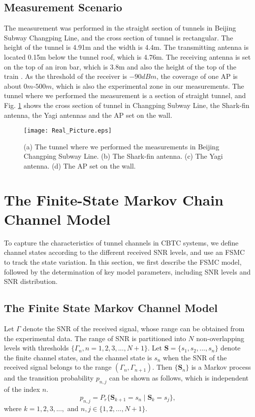 \documentclass[conference]{IEEEtran}
\begin{document}
\subsection{Measurement Scenario}
The measurement was performed in the straight section of tunnels in Beijing Subway Changping Line, and the cross section of tunnel is rectangular. The height of the tunnel is 4.91m and the width is 4.4m. The transmitting antenna is located 0.15m below the tunnel roof, which is 4.76m. The receiving antenna is set on the top of an iron bar, which is 3.8m and also the height of the top of the train . As the threshold of the receiver is $-90dBm$, the coverage of one AP is about $0m$-$500m$, which is also the experimental zone in our measurements. The tunnel where we performed the measurement is a section of straight tunnel, and Fig. \ref{RT} shows the cross section of tunnel in Changping Subway Line, the Shark-fin antenna, the Yagi antennas and the AP set on the wall.







\begin{figure}[tp]
\centering
\texttt{[image: Real\_Picture.eps]}
\caption{(a) The tunnel where we performed the measurements in Beijing Changping Subway Line. (b) The Shark-fin antenna. (c) The Yagi antenna. (d) The AP set on the wall.}
\label{RT}
\end{figure}








\section{The Finite-State Markov Chain Channel Model}
\label{Sec_FSMC}
To capture the characteristics of tunnel channels in CBTC systems, we define channel states according to the different received SNR levels, and use an FSMC to track the state variation. In this section, we first describe the FSMC model, followed by the determination of key model parameters, including  SNR levels and SNR distribution.

\subsection{The Finite State Markov Channel Model}
Let $\Gamma$ denote the SNR of the received signal, whose range can be obtained from the experimental data. The range of SNR is partitioned into $N$ non-overlapping levels with thresholds $\{\Gamma_{n}, n = 1, 2, 3, ..., N+1\}$. Let $\textbf{S}=\{s_{1}, s_{2}, ..., s_{n}\}$ denote the finite channel states, and the channel state is $s_{n}$ when the SNR of the received signal belongs to the range $(\Gamma_{n}, \Gamma_{n+1})$. Then $\{\textbf{S}_{n}\}$ is a  Markov process and the transition probability $p_{n,j}$ can be shown as follows, which is independent of the index $n$.
\begin{equation}
p_{n,j}=P_{r}\{\textbf{S}_{k+1}=s_{n} \mid \textbf{S}_{k}=s_{j}\},
\label{STP}
\end{equation}
where $k = 1, 2, 3, ..., $ and $n, j \in \{1 ,2, ..., N+1\}$.
\end{document}
